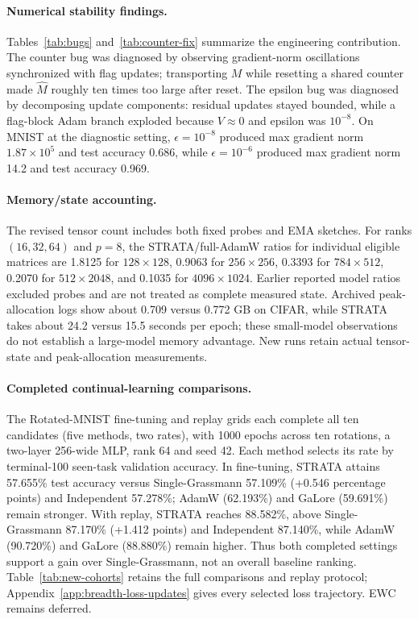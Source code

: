 \paragraph{Numerical stability findings.} Tables~\ref{tab:bugs} and~\ref{tab:counter-fix} summarize the engineering contribution. The counter bug was diagnosed by observing gradient-norm oscillations synchronized with flag updates; transporting $M$ while resetting a shared counter made $\hat M$ roughly ten times too large after reset. The epsilon bug was diagnosed by decomposing update components: residual updates stayed bounded, while a flag-block Adam branch exploded because $V\approx0$ and epsilon was $10^{-8}$. On MNIST at the diagnostic setting, $\epsilon=10^{-8}$ produced max gradient norm $1.87\times10^5$ and test accuracy 0.686, while $\epsilon=10^{-6}$ produced max gradient norm 14.2 and test accuracy 0.969.

\paragraph{Memory/state accounting.} The revised tensor count includes both fixed probes and EMA sketches. For ranks $(16,32,64)$ and $p=8$, the STRATA/full-AdamW ratios for individual eligible matrices are 1.8125 for $128\times128$, 0.9063 for $256\times256$, 0.3393 for $784\times512$, 0.2070 for $512\times2048$, and 0.1035 for $4096\times1024$. Earlier reported model ratios excluded probes and are not treated as complete measured state. Archived peak-allocation logs show about 0.709 versus 0.772 GB on CIFAR, while STRATA takes about 24.2 versus 15.5 seconds per epoch; these small-model observations do not establish a large-model memory advantage. New runs retain actual tensor-state and peak-allocation measurements.

\paragraph{Completed continual-learning comparisons.} The Rotated-MNIST fine-tuning and replay grids each complete all ten candidates (five methods, two rates), with 1000 epochs across ten rotations, a two-layer 256-wide MLP, rank 64 and seed 42. Each method selects its rate by terminal-100 seen-task validation accuracy. In fine-tuning, STRATA attains 57.655\% test accuracy versus Single-Grassmann 57.109\% (+0.546 percentage points) and Independent 57.278\%; AdamW (62.193\%) and GaLore (59.691\%) remain stronger. With replay, STRATA reaches 88.582\%, above Single-Grassmann 87.170\% (+1.412 points) and Independent 87.140\%, while AdamW (90.720\%) and GaLore (88.880\%) remain higher. Thus both completed settings support a gain over Single-Grassmann, not an overall baseline ranking. Table~\ref{tab:new-cohorts} retains the full comparisons and replay protocol; Appendix~\ref{app:breadth-loss-updates} gives every selected loss trajectory. EWC remains deferred.


